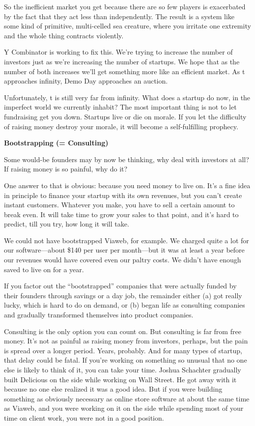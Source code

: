 So the inefficient market you get because there are so few players is
exacerbated by the fact that they act less than independently. The
result is a system like some kind of primitive, multi-celled sea
creature, where you irritate one extremity and the whole thing contracts
violently.

Y Combinator is working to fix this. We're trying to increase the number
of investors just as we're increasing the number of startups. We hope
that as the number of both increases we'll get something more like an
efficient market. As t approaches infinity, Demo Day approaches an
auction.

Unfortunately, t is still very far from infinity. What does a startup do
now, in the imperfect world we currently inhabit? The most important
thing is not to let fundraising get you down. Startups live or die on
morale. If you let the difficulty of raising money destroy your morale,
it will become a self-fulfilling prophecy.

\textbf{Bootstrapping (= Consulting)}

Some would-be founders may by now be thinking, why deal with investors
at all? If raising money is so painful, why do it?

One answer to that is obvious: because you need money to live on. It's a
fine idea in principle to finance your startup with its own revenues,
but you can't create instant customers. Whatever you make, you have to
sell a certain amount to break even. It will take time to grow your
sales to that point, and it's hard to predict, till you try, how long it
will take.

We could not have bootstrapped Viaweb, for example. We charged quite a
lot for our software---about \$140 per user per month---but it was at
least a year before our revenues would have covered even our paltry
costs. We didn't have enough saved to live on for a year.

If you factor out the ``bootstrapped'' companies that were actually
funded by their founders through savings or a day job, the remainder
either (a) got really lucky, which is hard to do on demand, or (b) began
life as consulting companies and gradually transformed themselves into
product companies.

Consulting is the only option you can count on. But consulting is far
from free money. It's not as painful as raising money from investors,
perhaps, but the pain is spread over a longer period. Years, probably.
And for many types of startup, that delay could be fatal. If you're
working on something so unusual that no one else is likely to think of
it, you can take your time. Joshua Schachter gradually built Delicious
on the side while working on Wall Street. He got away with it because no
one else realized it was a good idea. But if you were building something
as obviously necessary as online store software at about the same time
as Viaweb, and you were working on it on the side while spending most of
your time on client work, you were not in a good position.

